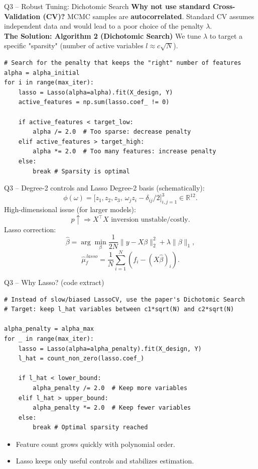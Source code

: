 \documentclass[aspectratio=169]{beamer}
\begin{document}
\begin{frame}[fragile]{Q3 -- Robust Tuning: Dichotomic Search}
	\small
	\textbf{Why not use standard Cross-Validation (CV)?}
	MCMC samples are \textbf{autocorrelated}. Standard CV assumes independent data and would lead to a poor choice of the penalty $\lambda$.
	\\[0.8em]
	\textbf{The Solution: Algorithm 2 (Dichotomic Search)}
	We tune $\lambda$ to target a specific "sparsity" (number of active variables $l \approx c\sqrt{N}$).

	\begin{lstlisting}[style=py]
# Search for the penalty that keeps the "right" number of features
alpha = alpha_initial
for i in range(max_iter):
    lasso = Lasso(alpha=alpha).fit(X_design, Y)
    active_features = np.sum(lasso.coef_ != 0)
    
    if active_features < target_low:
        alpha /= 2.0  # Too sparse: decrease penalty
    elif active_features > target_high:
        alpha *= 2.0  # Too many features: increase penalty
    else:
        break # Sparsity is optimal
    \end{lstlisting}
\end{frame}
\begin{frame}{Q3 -- Degree-2 controls and Lasso}
	\small
	Degree-2 basis (schematically):
	\[
		\phi(\omega)=\big[z_1,z_2,z_3,\ \omega_j z_i-\delta_{ij}/2\big]_{i,j=1}^3
		\in \mathbb R^{12}.
	\]
	High-dimensional issue (for larger models):
	\[
		p \uparrow \Rightarrow X^\top X \text{ inversion unstable/costly}.
	\]
	Lasso correction:
	\[
		\hat\beta=\arg\min_{\beta}
		\frac{1}{2N}\|y-X\beta\|_2^2+\lambda\|\beta\|_1,
	\]
	\[
		\hat\mu_f^{\,lasso}=\frac1N\sum_{i=1}^N\left(f_i-(X\hat\beta)_i\right).
	\]
\end{frame}

\begin{frame}[fragile]{Q3 -- Why Lasso? (code extract)}
	\begin{lstlisting}[style=py]
# Instead of slow/biased LassoCV, use the paper's Dichotomic Search
# Target: keep l_hat variables between c1*sqrt(N) and c2*sqrt(N)

alpha_penalty = alpha_max
for _ in range(max_iter):
    lasso = Lasso(alpha=alpha_penalty).fit(X_design, Y)
    l_hat = count_non_zero(lasso.coef_)
    
    if l_hat < lower_bound:
        alpha_penalty /= 2.0  # Keep more variables
    elif l_hat > upper_bound:
        alpha_penalty *= 2.0  # Keep fewer variables
    else:
        break # Optimal sparsity reached
\end{lstlisting}
	\vspace{-0.5em}
	\begin{itemize}
		\item Feature count grows quickly with polynomial order.
		\item Lasso keeps only useful controls and stabilizes estimation.
	\end{itemize}
\end{frame}
\end{document}
